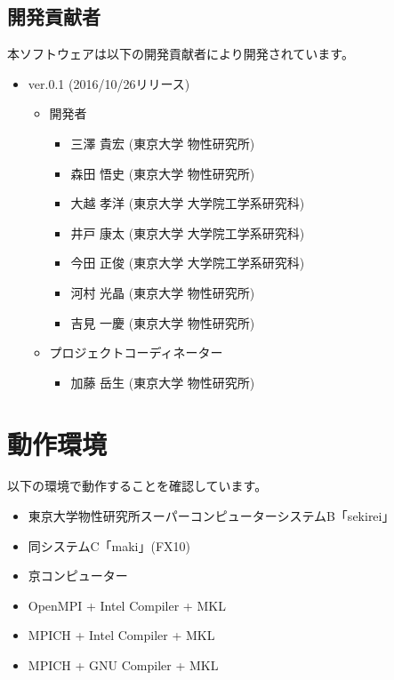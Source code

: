 \subsection{開発貢献者}
\label{subsec:developers}
本ソフトウェアは以下の開発貢献者により開発されています。
\begin{itemize}
\item{ver.0.1 (2016/10/26リリース)}
\begin{itemize}
\item{開発者}
	\begin{itemize}
	\item{三澤 貴宏 (東京大学 物性研究所)}
	\item{森田 悟史 (東京大学 物性研究所)}
	\item{大越 孝洋 (東京大学 大学院工学系研究科)}
	\item{井戸 康太 (東京大学 大学院工学系研究科)}
	\item{今田 正俊 (東京大学 大学院工学系研究科)}
	\item{河村 光晶 (東京大学 物性研究所)}
	\item{吉見 一慶 (東京大学 物性研究所)}
	\end{itemize}

\item{プロジェクトコーディネーター}
	\begin{itemize}
	\item{加藤 岳生 (東京大学 物性研究所)}
	\end{itemize}

\end{itemize}

\end{itemize}


\section{動作環境}
 以下の環境で動作することを確認しています。
\begin{itemize}
\item 東京大学物性研究所スーパーコンピューターシステムB「sekirei」
\item 同システムC「maki」(FX10)
\item 京コンピューター
\item OpenMPI + Intel Compiler + MKL
\item MPICH + Intel Compiler + MKL
\item MPICH + GNU Compiler + MKL
\end{itemize}
